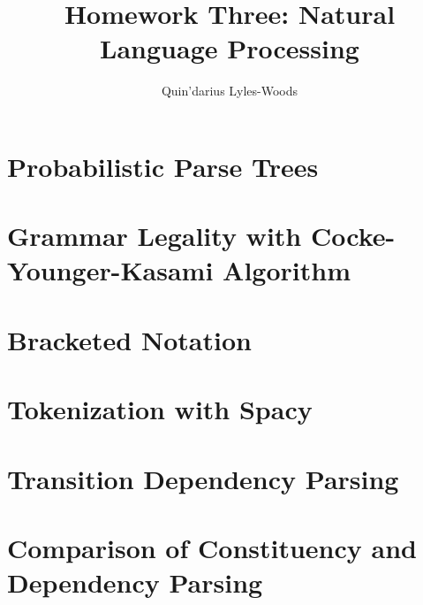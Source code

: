 \documentclass{article}
\title{Homework Three: Natural Language Processing}
\author{Quin'darius Lyles-Woods}
\begin{document}
\maketitle
\section{Probabilistic Parse Trees}

\section{Grammar Legality with Cocke-Younger-Kasami Algorithm}

\section{Bracketed Notation}

\section{Tokenization with Spacy}

\section{Transition Dependency Parsing}

\section{Comparison of Constituency and Dependency Parsing}

\end{document}
